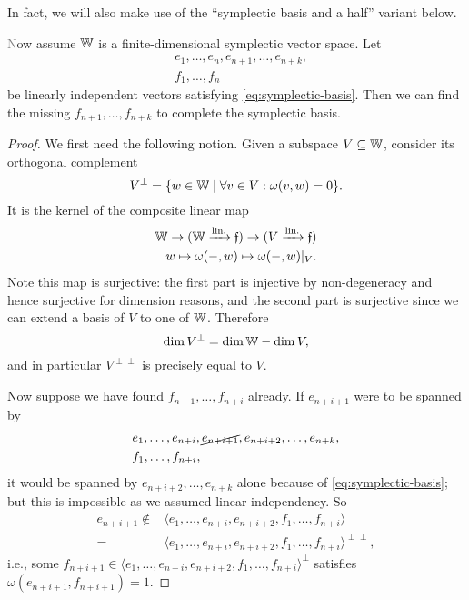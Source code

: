 \color{gray}
In fact, we will also make use of the ``symplectic basis and a half'' variant below. 
\begin{proposition}\label{prop:symplectic-basis-and-a-half}\textcolor{gray}
    Now assume $\mathbb{W}$ is a finite-dimensional symplectic vector space.
    Let 
    \begin{align*} 
        &e_1, \ldots, e_n, e_{n+1}, \ldots, e_{n+k}, \\
        &f_1, \ldots, f_n
    \end{align*}
    be linearly independent vectors satisfying \eqref{eq:symplectic-basis}.
    Then we can find the missing $f_{n+1}, \ldots, f_{n+k}$ to complete the symplectic basis.
\end{proposition}
\color{black}

\begin{proof}
    We first need the following notion.
    Given a subspace $V \subseteq \mathbb{W}$, consider its orthogonal complement
    \[
        V^\perp = \{ w \in \mathbb{W} \mid \forall v \in V : \omega(v, w) = 0 \}.
    \]
    It is the kernel of the composite linear map 
    \begin{align*}
        \mathbb{W} \to (\mathbb{W} \xrightarrow{\text{lin.}} \mathfrak{f}) \to (V \xrightarrow{\text{lin.}} \mathfrak{f}) \\
        w \mapsto \omega(-, w) \mapsto \omega(-, w)|_V.
    \end{align*}
    Note this map is surjective:
    the first part is injective by non-degeneracy and hence surjective for dimension reasons,
    and the second part is surjective since we can extend a basis of $V$ to one of $\mathbb{W}$.
    Therefore 
    \[
        \dim V^\perp = \dim \mathbb{W} - \dim V,
    \]
    and in particular $V^{\perp \perp}$ is precisely equal to $V$.

    Now suppose we have found $f_{n+1}, \ldots, f_{n+i}$ already.
    If $e_{n+i+1}$ were to be spanned by 
    \begin{align*}
        &e_1, \ldots, e_{n+i}, \cancel{e_{n+i+1}}, e_{n+i+2}, \ldots, e_{n+k},\\ 
        &f_1, \ldots, f_{n+i},
    \end{align*}
    it would be spanned by $e_{n+i+2}, \ldots, e_{n+k}$ alone because of \eqref{eq:symplectic-basis};
    but this is impossible as we assumed linear independency.
    So 
    \begin{align*}
        e_{n+i+1} 
        \not\in{} &\langle e_1, \ldots, e_{n+i}, e_{n+i+2}, f_1, \ldots, f_{n+i} \rangle \\
        ={} &\langle e_1, \ldots, e_{n+i}, e_{n+i+2}, f_1, \ldots, f_{n+i} \rangle^{\perp \perp},
    \end{align*}
    i.e., some $f_{n+i+1} \in \langle e_1, \ldots, e_{n+i}, e_{n+i+2}, f_1, \ldots, f_{n+i} \rangle^\perp$ satisfies $\omega(e_{n+i+1}, f_{n+i+1}) = 1$.
\end{proof}

